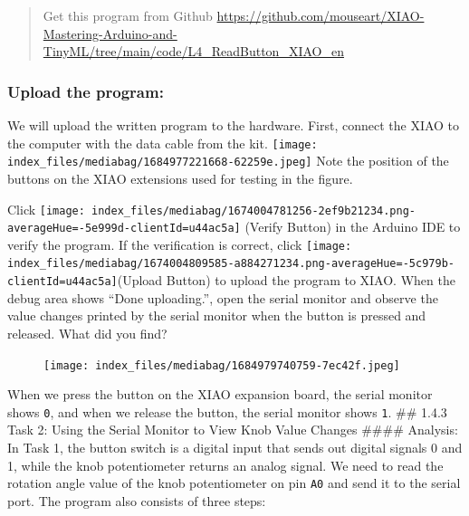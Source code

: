 \documentclass[
  letterpaper,
  DIV=11,
  numbers=noendperiod]{scrreprt}
\begin{document}
\begin{quote}
Get this program from Github
\url{https://github.com/mouseart/XIAO-Mastering-Arduino-and-TinyML/tree/main/code/L4_ReadButton_XIAO_en}
\end{quote}

\hypertarget{upload-the-program}{%
\subsubsection*{Upload the program:}\label{upload-the-program}}

We will upload the written program to the hardware. First, connect the
XIAO to the computer with the data cable from the kit.
\texttt{[image: index\_files/mediabag/1684977221668-62259e.jpeg]} Note
the position of the buttons on the XIAO extensions used for testing in
the figure.

Click
\texttt{[image: index\_files/mediabag/1674004781256-2ef9b21234.png-averageHue=-5e999d-clientId=u44ac5a]}
(Verify Button) in the Arduino IDE to verify the program. If the
verification is correct, click
\texttt{[image: index\_files/mediabag/1674004809585-a884271234.png-averageHue=-5c979b-clientId=u44ac5a]}(Upload
Button) to upload the program to XIAO. When the debug area shows ``Done
uploading.'', open the serial monitor and observe the value changes
printed by the serial monitor when the button is pressed and released.
What did you find?

\begin{figure}[H]

{\centering \texttt{[image: index\_files/mediabag/1684979740759-7ec42f.jpeg]}

}

\end{figure}

When we press the button on the XIAO expansion board, the serial monitor
shows \texttt{0}, and when we release the button, the serial monitor
shows \texttt{1}. \#\# 1.4.3 Task 2: Using the Serial Monitor to View
Knob Value Changes \#\#\#\# Analysis: In Task 1, the button switch is a
digital input that sends out digital signals 0 and 1, while the knob
potentiometer returns an analog signal. We need to read the rotation
angle value of the knob potentiometer on pin \texttt{A0} and send it to
the serial port. The program also consists of three steps:
\end{document}
